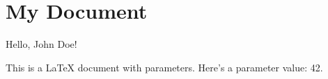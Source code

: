 \documentclass{article}
\begin{document}
\section*{My Document}

Hello, John Doe!

This is a LaTeX document with parameters. Here's a parameter value: 42.
\end{document}
